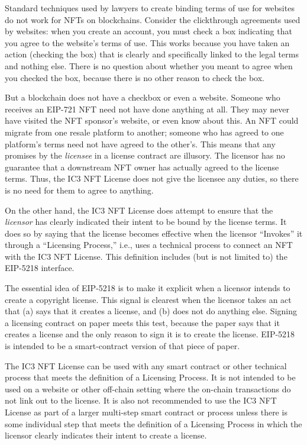 \documentclass{article}
\newcommand{\eiplicense}{EIP-5218\xspace}
\newcommand{\iccclicense}{IC3 NFT License\xspace}
\begin{document}
Standard techniques used by lawyers to create binding terms of use for websites do not work for NFTs on blockchains. Consider the clickthrough agreements used by websites: when you create an account, you must check a box indicating that you agree to the website's terms of use. This works because you have taken an action (checking the box) that is clearly and specifically linked to the legal terms and nothing else. There is no question about whether you meant to agree when you checked the box, because there is no other reason to check the box. 

But a blockchain does not have a checkbox or even a website. Someone who receives an EIP-721 NFT need not have done anything at all. They may never have visited the NFT sponsor's website, or even know about this. An NFT could  migrate from one resale platform to another; someone who has agreed to one platform's terms need not have agreed to the other's. This means that any promises by the \emph{licensee} in a license contract are illusory. The licensor has no guarantee that a downstream NFT owner has actually agreed to the license terms. Thus, the \iccclicense does not give the licensee any duties, so there is no need for them to agree to anything.

On the other hand, the \iccclicense does attempt to ensure that the \emph{licensor} has clearly indicated their intent to be bound by the license terms. It does so by saying that the license becomes effective when the licensor ``Invokes'' it through a ``Licensing Process,'' i.e., uses a technical process to connect an NFT with the \iccclicense. This definition includes (but is not limited to) the \eiplicense interface. 

The essential idea of \eiplicense  is to make it explicit when a licensor intends to create a copyright license. This signal is clearest when the licensor takes an act that (a) says that it creates a license, and (b) does not do anything else. Signing a licensing contract on paper meets this test, because the paper says that it creates a license and the only reason to sign it is to create the license. \eiplicense is intended to be a smart-contract version of that piece of paper. 

The \iccclicense can be used with any smart contract or other technical process that meets the definition of a Licensing Process. It is not intended to be used on a website or other off-chain setting where the on-chain transactions do not link out to the license. It is also not recommended to use the \iccclicense as part of a larger multi-step smart contract or process unless there is some individual step that meets the definition of a Licensing Process in which the licensor clearly indicates their intent to create a license.
\end{document}
